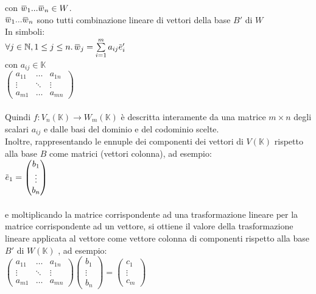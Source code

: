 \documentclass[a4paper, twoside, italian, 11pt]{book}
\newcommand{\overbar}[1] {\mkern 1.5mu\overline{\mkern-1.5mu#1\mkern-1.5mu}\mkern 1.5mu}
\newcommand{\N}{\mathbb N}
\newcommand{\K}{\mathbb K}
\begin{document}
\noindent
con $\overbar w_1 ... \overbar w_n \in W$. \\

\noindent
$\overbar w_1 ... \overbar w_n$ sono tutti combinazione lineare di vettori della base $B'$ di $W$ \\

\noindent
In simboli: \\

$\forall j \in \N, 1 \leq j \leq n \ldotp \overbar w_j = \sum\limits_{i = 1}^{m} a_{ij} \overbar e'_i$ \\

\noindent
con $a_{ij} \in \K$ \\

\noindent
$\begin{pmatrix}
a_{11} & \dots & a_{1n} \\
\vdots & \ddots & \vdots \\
a_{m1} & \dots & a_{mn}
\end{pmatrix}$ \\\\

\noindent
Quindi $f : V_n(\K) \rightarrow W_m(\K)$ è descritta interamente da una matrice $m \times n$ degli scalari $a_{ij}$ e dalle basi del dominio e del codominio scelte.\\

\noindent
Inoltre, rappresentando le ennuple dei componenti dei vettori di $V(\K)$ rispetto alla base $B$ come matrici (vettori colonna), ad esempio: \\

$\overbar e_1 =
\begin{pmatrix}
b_1 \\
\vdots \\
b_n
\end{pmatrix}$ \\\\

\noindent
e moltiplicando la matrice corrispondente ad una trasformazione lineare per la matrice corrispondente ad un vettore, si ottiene il valore della trasformazione lineare applicata al vettore come vettore colonna di componenti rispetto alla base $B'$ di $W(\K)$ , ad esempio: \\

$\begin{pmatrix}
a_{11} & \dots & a_{1n} \\
\vdots & \ddots & \vdots \\
a_{m1} & \dots & a_{mn}
\end{pmatrix}
\begin{pmatrix}
b_1 \\
\vdots \\
b_n
\end{pmatrix} = 
\begin{pmatrix}
c_1 \\
\vdots \\
c_m
\end{pmatrix}
$ \\\\\\
\end{document}
